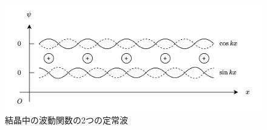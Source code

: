 \begin{figure}
	\centering
	\includegraphics[width=0.6\linewidth]{src/figures/crystal-wave-function/crystal-wave-function.png}
	\caption{結晶中の波動関数の2つの定常波}\label{fig:crystal-wave-function}
\end{figure}
